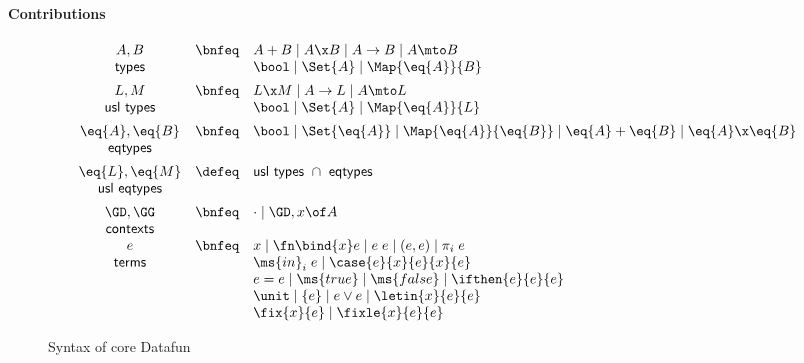 \documentclass[preprint]{sigplanconf}
\renewcommand{\pipe}{\mathrel{\mid}} %
\newcommand{\uto}{\to}
\begin{document}
\paragraph{Contributions}


\begin{figure}
  \[\begin{array}{ccl}
    A, B     &\bnfeq& A + B \pipe A \x B \pipe A \uto B \pipe A \mto B
    \\
    \textsf{types} && \bool \pipe \Set{A} \pipe \Map{\eq{A}}{B}
    \vspace{0.5em}\\
    L, M         &\bnfeq& L \x M \pipe A \uto L \pipe A \mto L
    \\
    \textsf{usl types} && \bool \pipe \Set{A} \pipe \Map{\eq{A}}{L}
    \vspace{0.5em}\\
    \eq{A}, \eq{B} &\bnfeq& \bool \pipe \Set{\eq{A}}
                            \pipe \Map{\eq{A}}{\eq{B}}
                            \pipe \eq{A} + \eq{B} \pipe \eq{A} \x \eq{B}\\
    \textsf{eqtypes} &&
    \vspace{0.5em}\\
    \eq{L}, \eq{M} &\defeq& \textsf{usl types}~\cap~\textsf{eqtypes}\\
    \textsf{usl eqtypes} &&
    \vspace{0.5em}\\
    \GD, \GG &\bnfeq& \cdot \pipe \GD, x\of A\\
    \textsf{contexts}\\
    e &\bnfeq& x \pipe \fn\bind{x} e \pipe e\;e \pipe (e,e) \pipe \pi_i\;e\\
    \textsf{terms} && \ms{in}_i\;e \pipe \case{e}{x}{e}{x}{e}\\
    && e = e \pipe \ms{true} \pipe \ms{false} \pipe \ifthen{e}{e}{e}\\
    && \unit \pipe \{e\} \pipe e \vee e \pipe \letin{x}{e}{e}\\
    && \fix{x}{e} \pipe \fixle{x}{e}{e}
  \end{array}\]
  \caption{Syntax of core Datafun}
\end{figure}
\end{document}
